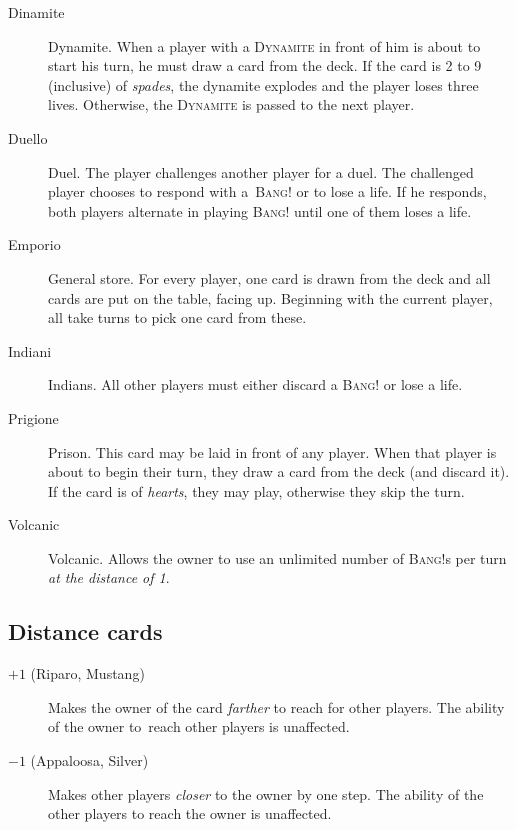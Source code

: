 \documentclass[a4paper,10pt,reqno]{amsart}
\newcommand{\card}[1]{\textsc{#1}}
\newcommand{\col}[1]{\textit{#1}}
\begin{document}
	\begin{description}
		\item[Dinamite] Dynamite. When a player with a \card{Dynamite} in front of him is about
			to start his turn, he must draw a card from the deck. If the card is 2 to 9 (inclusive)
			of \col{spades}, the dynamite explodes and the player loses three lives. Otherwise,
			the \card{Dynamite} is passed to the next player.
		\item[Duello] Duel. The player challenges another player for a duel. The challenged player
			chooses to respond with a~\card{Bang!} or to lose a life. If he responds, both players alternate
			in playing \card{Bang!} until one of them loses a life.
		\item[Emporio] General store. For every player, one card is drawn from the deck and all cards
			are put on the table, facing up. Beginning with the current player, all take turns to pick
			one card from these.
		\item[Indiani] Indians. All other players must either discard a \card{Bang!} or lose a life.
		\item[Prigione] Prison. This card may be laid in front of any player. When that player is about
			to begin their turn, they draw a card from the deck (and discard it). If the card is of
			\col{hearts}, they may play, otherwise they skip the turn.
		\item[Volcanic] Volcanic. Allows the owner to use an unlimited number of \card{Bang!}s per turn
			\col{at the distance of 1}.
	\end{description}
	
	\subsection*{Distance cards}
	
	\begin{description}
		\item[$+1$ (Riparo, Mustang)] Makes the owner of the card \emph{farther} to reach for other players.
			The ability of the owner to~reach other players is unaffected.
		\item[$-1$ (Appaloosa, Silver)] Makes other players \emph{closer} to the owner by one step.
			The ability	of the other players to reach the owner is unaffected.
	\end{description}
	
\end{document}
